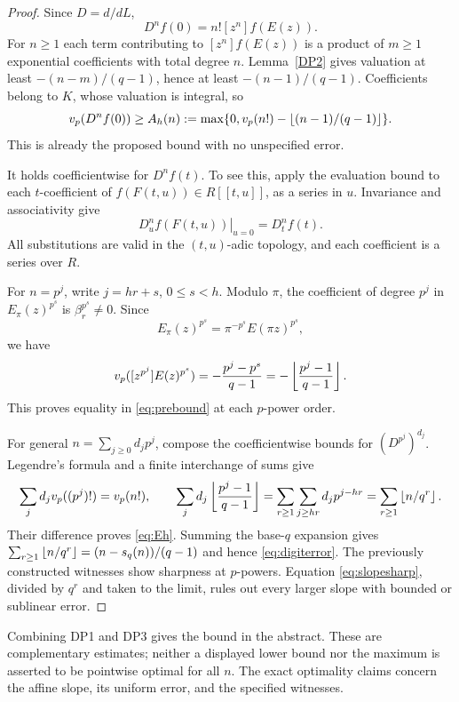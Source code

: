 \documentclass[11pt,a4paper]{article}
\theoremstyle{definition}\newtheorem{remark}[theorem]{Remark}
\newcommand{\vp}{v_p}\newcommand{\dR}{\mathrm{dR}}\newcommand{\crys}{\mathrm{crys}}
\begin{document}
\begin{proof}
Since $D=d/dL$,
\begin{equation}\label{eq:eval}
 D^nf(0)=n![z^n]f(E(z)).
\end{equation}
For $n\ge1$ each term contributing to $[z^n]f(E(z))$ is a product of $m\ge1$ exponential coefficients with total degree $n$. Lemma~\ref{DP2} gives valuation at least $-(n-m)/(q-1)$, hence at least $-(n-1)/(q-1)$. Coefficients belong to $K$, whose valuation is integral, so
\begin{equation}\label{eq:prebound}
 \vp(D^nf(0))\ge A_h(n):=\max\{0,\vp(n!)-\floor{(n-1)/(q-1)}\}.
\end{equation}
This is already the proposed bound with no unspecified error.

It holds coefficientwise for $D^nf(t)$. To see this, apply the evaluation bound to each $t$-coefficient of $f(F(t,u))\in R[[t,u]]$, as a series in $u$. Invariance and associativity give
\[
 \left.D_u^nf(F(t,u))\right|_{u=0}=D_t^nf(t).
\]
All substitutions are valid in the $(t,u)$-adic topology, and each coefficient is a series over $R$.

For $n=p^j$, write $j=hr+s$, $0\le s<h$. Modulo $\pi$, the coefficient of degree $p^j$ in $E_\pi(z)^{p^s}$ is $\beta_r^{p^s}\ne0$. Since
\[
 E_\pi(z)^{p^s}=\pi^{-p^s}E(\pi z)^{p^s},
\]
we have
\[
 \vp([z^{p^j}]E(z)^{p^s})=-\frac{p^j-p^s}{q-1}
 =-\floor{\frac{p^j-1}{q-1}}.
\]
This proves equality in \eqref{eq:prebound} at each $p$-power order.

For general $n=\sum_{j\ge0}d_jp^j$, compose the coefficientwise bounds for $(D^{p^j})^{d_j}$. Legendre's formula and a finite interchange of sums give
\[
 \sum_jd_j\vp((p^j)!)=\vp(n!),\qquad
 \sum_jd_j\floor{\frac{p^j-1}{q-1}}
 =\sum_{r\ge1}\sum_{j\ge hr}d_jp^{j-hr}
 =\sum_{r\ge1}\floor{n/q^r}.
\]
Their difference proves \eqref{eq:Eh}. Summing the base-$q$ expansion gives $\sum_{r\ge1}\left\lfloor n/q^r\right\rfloor=(n-s_q(n))/(q-1)$ and hence \eqref{eq:digiterror}. The previously constructed witnesses show sharpness at $p$-powers. Equation \eqref{eq:slopesharp}, divided by $q^r$ and taken to the limit, rules out every larger slope with bounded or sublinear error.
\end{proof}

Combining DP1 and DP3 gives the bound in the abstract. These are complementary estimates; neither a displayed lower bound nor the maximum is asserted to be pointwise optimal for all $n$. The exact optimality claims concern the affine slope, its uniform error, and the specified witnesses.
\end{document}
